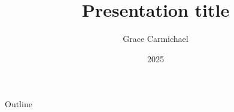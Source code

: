 \documentclass[aspectratio=43]{beamer}
\title[Presentation title]{Presentation title} %
\author[G. Carmichael]{Grace Carmichael}
\institute[UCT]{
    Department of Statistical Sciences%
    \\
    University of Cape Town
}
\date{2025}
\begin{document}
    \frame{\titlepage} %
    
    \begin{frame}{Outline} %
        \tableofcontents
    \end{frame}
    
     
\end{document}
